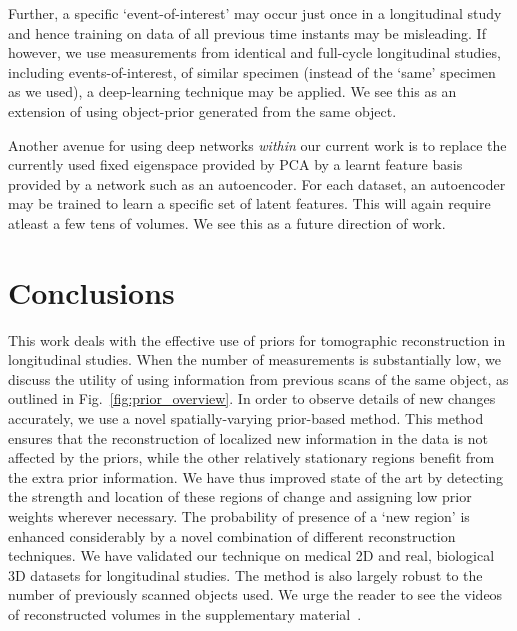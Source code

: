 \documentclass[journal]{IEEEtran}
\begin{document}
  Further, a specific `event-of-interest' may occur just once in a
  longitudinal study and hence training on data of all previous time
  instants may be misleading. If however, we use measurements from
  identical and full-cycle longitudinal studies, including
  events-of-interest, of similar specimen (instead of the `same'
  specimen as we used), a deep-learning technique may be applied. We
  see this as an extension of using object-prior generated from the
  same object.

  Another avenue for using deep networks \textit{within} our current
  work is to replace the currently used fixed eigenspace provided by
  PCA by a learnt feature basis provided by a network such as an
  autoencoder. For each dataset, an autoencoder may be trained to
  learn a specific set of latent features. This will again require
  atleast a few tens of volumes. We see this as a future direction of
  work.



\section{Conclusions}
\label{sec:conclusions}
This work deals with the effective use of priors for tomographic
reconstruction in longitudinal studies. When the number of measurements is
substantially low, we discuss the utility of
using information from previous scans of the same object, as outlined in
Fig.~\ref{fig:prior_overview}. In order to observe details of new changes
accurately, we use a novel
spatially-varying prior-based method. This method ensures that the
reconstruction of localized new information in the data is not
affected by the priors, while the other relatively stationary regions benefit from the extra prior information. %
We have thus
improved state of the art by detecting the strength and location
of these regions of change and
assigning low prior weights wherever necessary. The probability of
presence of a `new region' is enhanced considerably by a novel
combination of different reconstruction techniques.  We have validated
our technique on medical 2D and real, biological 3D datasets for
longitudinal studies. The method is also largely robust to the number
of previously scanned objects used. We urge the reader to see the
videos of reconstructed volumes in the supplementary
material~\cite{supp_paper}.
\end{document}
